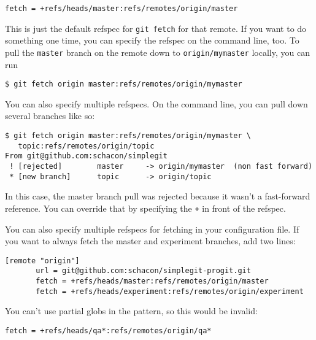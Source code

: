 \documentclass[a4paper]{book}
\begin{document}
\begin{shaded}\begin{verbatim}
fetch = +refs/heads/master:refs/remotes/origin/master
\end{verbatim}\end{shaded}

This is just the default refspec for \texttt{git fetch} for that remote. If you want to do something one time, you can specify the refspec on the command line, too. To pull the \texttt{master} branch on the remote down to \texttt{origin/mymaster} locally, you can run

\begin{shaded}\begin{verbatim}
$ git fetch origin master:refs/remotes/origin/mymaster
\end{verbatim}\end{shaded}

You can also specify multiple refspecs. On the command line, you can pull down several branches like so:

\begin{shaded}\begin{verbatim}
$ git fetch origin master:refs/remotes/origin/mymaster \
   topic:refs/remotes/origin/topic
From git@github.com:schacon/simplegit
 ! [rejected]        master     -> origin/mymaster  (non fast forward)
 * [new branch]      topic      -> origin/topic
\end{verbatim}\end{shaded}

In this case, the master branch pull was rejected because it wasn't a fast-forward reference. You can override that by specifying the \texttt{+} in front of the refspec.

You can also specify multiple refspecs for fetching in your configuration file. If you want to always fetch the master and experiment branches, add two lines:

\begin{shaded}\begin{verbatim}
[remote "origin"]
       url = git@github.com:schacon/simplegit-progit.git
       fetch = +refs/heads/master:refs/remotes/origin/master
       fetch = +refs/heads/experiment:refs/remotes/origin/experiment
\end{verbatim}\end{shaded}

You can't use partial globs in the pattern, so this would be invalid:

\begin{shaded}\begin{verbatim}
fetch = +refs/heads/qa*:refs/remotes/origin/qa*
\end{verbatim}\end{shaded}
\end{document}

